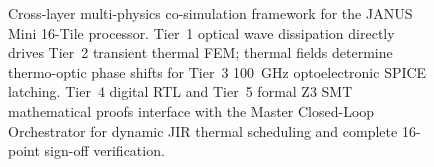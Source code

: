 \documentclass[journal]{IEEEtran}
\begin{document}
\begin{figure}[!t]
\caption{Cross-layer multi-physics co-simulation framework for the JANUS Mini 16-Tile processor. Tier~1 optical wave dissipation directly drives Tier~2 transient thermal FEM; thermal fields determine thermo-optic phase shifts for Tier~3 100~GHz optoelectronic SPICE latching. Tier~4 digital RTL and Tier~5 formal Z3 SMT mathematical proofs interface with the Master Closed-Loop Orchestrator for dynamic JIR thermal scheduling and complete 16-point sign-off verification.}
\label{fig:cosim_framework}
\end{figure}
\end{document}
